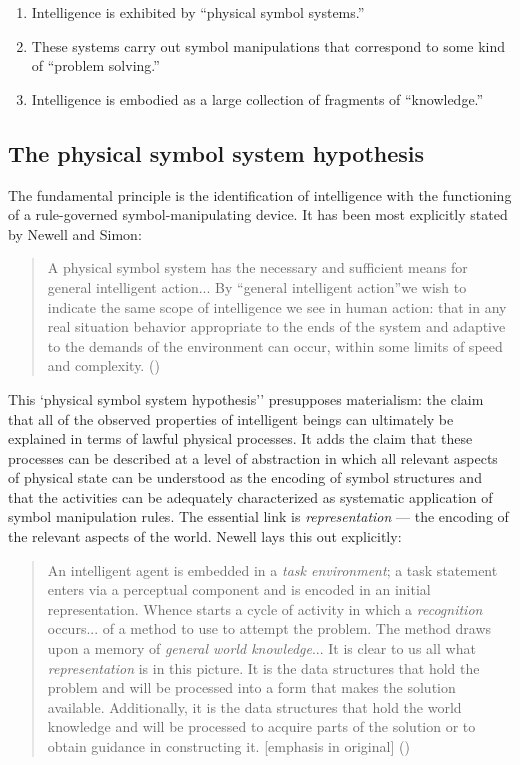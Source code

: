\documentclass[12pt]{article}
\def\bq{\begin{quote}}
\def\eq{\end{quote}}
\begin{document}
\begin{enumerate}
\item Intelligence is exhibited by ``physical symbol systems.''
\item These systems carry out symbol manipulations that correspond to some
kind of ``problem solving.''
\item Intelligence is embodied as a large collection of fragments of
``knowledge.''
\end{enumerate}

\subsection{The physical symbol system hypothesis}

The fundamental principle is the identification of intelligence with the functioning of a rule-governed symbol-manipulating device. It has been most explicitly stated by Newell and Simon:

\bq
A physical symbol system has the necessary and sufficient means for general intelligent action... By ``general intelligent action''we wish to indicate the same scope of intelligence we see in human action: that in any real situation behavior appropriate to the ends of the system and adaptive to the demands of the environment can occur, within some limits of speed and complexity. ({\it \cite{newell1976}})
\eq

This `physical symbol system hypothesis'' presupposes materialism: the claim that all of the observed properties of intelligent beings can ultimately be explained in terms of lawful physical processes. It adds the claim that these processes can be described at a level of abstraction in which all relevant aspects of physical state can be understood as the encoding of symbol structures and that the activities can be adequately characterized as systematic application of symbol manipulation rules.
The essential link is {\it representation} --- the encoding of the relevant aspects of the world. Newell lays this out explicitly:
\bq
An intelligent agent is embedded in a {\it task environment};  a task statement
enters via a perceptual component and is encoded in an initial
representation. Whence starts a cycle of activity in which a {\it recognition} occurs... of a method to use to attempt the problem. The method draws upon a memory of {\it general world knowledge}...
It is clear to us all what {\it representation} is in this picture. It is the data structures that hold the problem and will be processed into a form that makes the solution available. Additionally, it is the data structures that hold the world knowledge and will be processed to acquire parts of the solution or to obtain guidance in constructing it. [emphasis in original] ({\it \cite{newell1982}})
\eq
\end{document}
